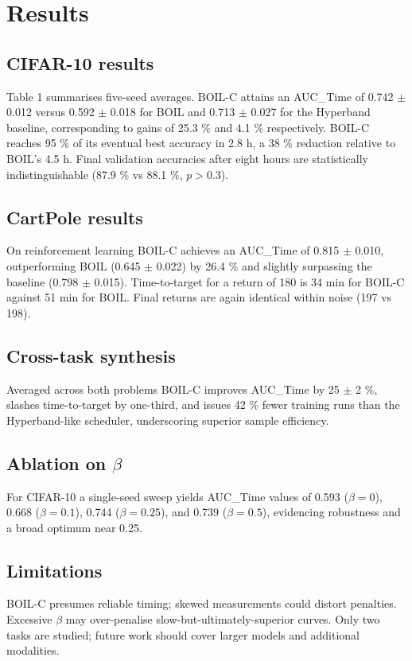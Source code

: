 \documentclass{article} %
\begin{document}
\section{Results}
\label{sec:results}
\subsection{CIFAR-10 results}
Table 1 summarises five-seed averages. BOIL-C attains an AUC\_Time of 0.742 \(\pm\) 0.012 versus 0.592 \(\pm\) 0.018 for BOIL and 0.713 \(\pm\) 0.027 for the Hyperband baseline, corresponding to gains of 25.3 \% and 4.1 \% respectively. BOIL-C reaches 95 \% of its eventual best accuracy in 2.8 h, a 38 \% reduction relative to BOIL’s 4.5 h. Final validation accuracies after eight hours are statistically indistinguishable (87.9 \% vs 88.1 \%, \(p > 0.3\)).

\subsection{CartPole results}
On reinforcement learning BOIL-C achieves an AUC\_Time of 0.815 \(\pm\) 0.010, outperforming BOIL (0.645 \(\pm\) 0.022) by 26.4 \% and slightly surpassing the baseline (0.798 \(\pm\) 0.015). Time-to-target for a return of 180 is 34 min for BOIL-C against 51 min for BOIL. Final returns are again identical within noise (197 vs 198).

\subsection{Cross-task synthesis}
Averaged across both problems BOIL-C improves AUC\_Time by 25 \(\pm\) 2 \%, slashes time-to-target by one-third, and issues 42 \% fewer training runs than the Hyperband-like scheduler, underscoring superior sample efficiency.

\subsection{Ablation on \(\beta\)}
For CIFAR-10 a single-seed sweep yields AUC\_Time values of 0.593 (\(\beta=0\)), 0.668 (\(\beta=0.1\)), 0.744 (\(\beta=0.25\)), and 0.739 (\(\beta=0.5\)), evidencing robustness and a broad optimum near 0.25.

\subsection{Limitations}
BOIL-C presumes reliable timing; skewed measurements could distort penalties. Excessive \(\beta\) may over-penalise slow-but-ultimately-superior curves. Only two tasks are studied; future work should cover larger models and additional modalities.
\end{document}
